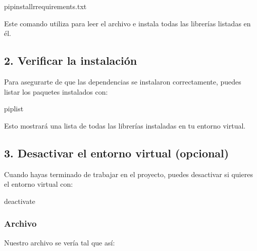 \documentclass[a4paper,10pt,oneside,spanish,openany]{sphinxmanual}
\begin{document}
\begin{sphinxVerbatim}[commandchars=\\\{\}]
pipinstall\PYGZhy{}rrequirements.txt
\end{sphinxVerbatim}

\sphinxAtStartPar
Este comando utiliza  para leer el archivo  e instala todas las librerías listadas en él.


\subsection{2. Verificar la instalación}
\label{\detokenize{configuracion_inicial/002.instalacion_librerias:verificar-la-instalacion}}
\sphinxAtStartPar
Para asegurarte de que las dependencias se instalaron correctamente, puedes listar los paquetes instalados con:

\begin{sphinxVerbatim}[commandchars=\\\{\}]
piplist
\end{sphinxVerbatim}

\sphinxAtStartPar
Esto mostrará una lista de todas las librerías instaladas en tu entorno virtual.


\subsection{3. Desactivar el entorno virtual (opcional)}
\label{\detokenize{configuracion_inicial/002.instalacion_librerias:desactivar-el-entorno-virtual-opcional}}
\sphinxAtStartPar
Cuando hayas terminado de trabajar en el proyecto, puedes desactivar si quieres el entorno virtual con:

\begin{sphinxVerbatim}[commandchars=\\\{\}]
deactivate
\end{sphinxVerbatim}


\subsubsection{Archivo }
\label{\detokenize{configuracion_inicial/002.instalacion_librerias:archivo-requirements-txt}}
\sphinxAtStartPar
Nuestro archivo  se vería tal que así:
\end{document}
